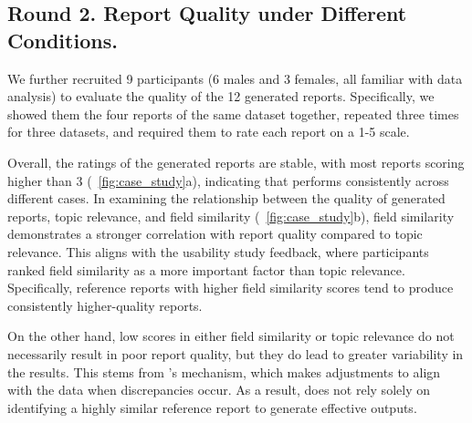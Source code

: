 \subsection{Round 2. Report Quality under Different Conditions. }
We further recruited 9 participants (6 males and 3 females, all familiar with data analysis) to evaluate the quality of the 12 generated reports. 
Specifically, we showed them the four reports of the same dataset together, repeated three times for three datasets, and required them to rate each report on a 1-5 scale. 

Overall, the ratings of the generated reports are stable, with most reports scoring higher than 3 (~\autoref{fig:case_study}a), indicating that \system{} performs consistently across different cases.
In examining the relationship between the quality of generated reports, topic relevance, and field similarity (~\autoref{fig:case_study}b), field similarity demonstrates a stronger correlation with report quality compared to topic relevance. This aligns with the usability study feedback, where participants ranked field similarity as a more important factor than topic relevance. Specifically, reference reports with higher field similarity scores tend to produce consistently higher-quality reports.

On the other hand, low scores in either field similarity or topic relevance do not necessarily result in poor report quality, but they do lead to greater variability in the results. This stems from \system{}'s mechanism, which makes adjustments to align with the data when discrepancies occur. As a result, \system{} does not rely solely on identifying a highly similar reference report to generate effective outputs.
